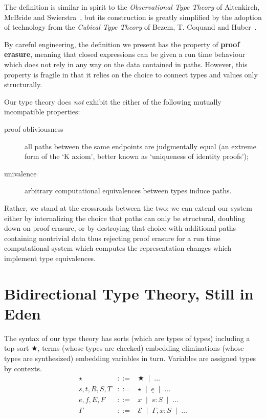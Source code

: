 \documentclass{sigplanconf}
\newcommand{\hb}{\!:\!}
\begin{document}
The definition is similar in spirit to the \emph{Observational
Type Theory} of Altenkirch, McBride and
Swierstra~\cite{DBLP:conf/plpv/AltenkirchMS07},
but its construction is greatly simplified by the adoption of
technology from the \emph{Cubical Type Theory} of Bezem, T. Coquand
and Huber~\cite{DBLP:conf/types/BezemCH13}.

By careful engineering, the definition we present has the property
of \textbf{proof erasure}, meaning that closed expressions can be
given a run time behaviour which does not rely in any way on the
data contained in paths. However, this property is
fragile in that it relies on the choice to connect types and
values only structurally.

Our type theory does \emph{not} exhibit the either of the following
mutually incompatible properties:
\begin{description}
\item[proof obliviousness] all paths between the same endpoints are
  judgmentally equal (an extreme form of the `K axiom', better known
  as `uniqueness of identity proofs');
\item[univalence] arbitrary computational equivalences between types induce paths.
\end{description}
Rather, we stand at the crossroads between the two: we can extend our
system either by internalizing the choice that paths can only be
structural, doubling down on proof erasure, or by destroying that
choice with additional paths containing nontrivial data thus
rejecting proof erasure for a run time computational system which
computes the representation changes which implement type equivalences.


\section{Bidirectional Type Theory, Still in Eden}

\newcommand{\gs}{\;\mid\;}
\newcommand{\neu}{\underline}
\newcommand{\TYPE}{\bigstar}
\newcommand{\EC}{\mathcal{E}}

The syntax of our type theory has sorts (which are types of types)
including a top sort $\TYPE$,
terms (whose types are checked) embedding eliminations (whose types are
synthesized) embedding variables in turn. Variables are assigned types by contexts.
\[\begin{array}{rrl}
\star & ::= & \TYPE \gs \ldots \\
s,t,R,S,T & ::= & \star \gs \neu e \gs \ldots \\
e,f,E,F & ::= & x \gs s\hb S \gs \ldots \\
\Gamma & ::= & \EC \gs \Gamma,x\hb S \gs \ldots
\end{array}\]
\end{document}
